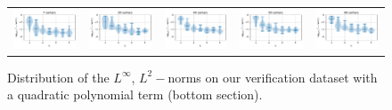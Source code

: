 \documentclass[12pt]{report} %
\begin{document}
\begin{figure}
\begin{tabular}{ccccc}
     {\includegraphics[width=.014\textwidth,clip=true,trim={0 0 9cm 0}]{imagenes/experiments/1d/ode/violins_l2_u_xx-2_C7_gaussian_kernel_shape_0.78125_Poly2.pdf}} & \includegraphics[width=.2\textwidth,clip=true,trim={.81cm 0 0 0}]{imagenes/experiments/1d/ode/violins_l2_u_xx-2_C30_gaussian_kernel_shape_5.6152_Poly2.pdf}  & \includegraphics[width=.2\textwidth,clip=true,trim={.81cm 0 0 0}]{imagenes/experiments/1d/ode/violins_l2_u_xx-2_C40_gaussian_kernel_shape_7.8125_Poly2.pdf}  & \includegraphics[width=.2\textwidth,clip=true,trim={.81cm 0 0 0}]{imagenes/experiments/1d/ode/violins_l2_u_xx-2_C50_gaussian_kernel_shape_9.7656_Poly2.pdf} & \includegraphics[width=.2\textwidth,clip=true,trim={.81cm 0 0 0}]{imagenes/experiments/1d/ode/violins_l2_u_xx-2_C60_gaussian_kernel_shape_11.7188_Poly2.pdf}   \\
  \end{tabular}
  \caption{Distribution of the $L^\infty$, $L^2-$norms on our verification dataset
    with a quadratic polynomial term (bottom section).}
  \label{fig:ode-results-overall-poly2}
\end{figure}
\end{document}
